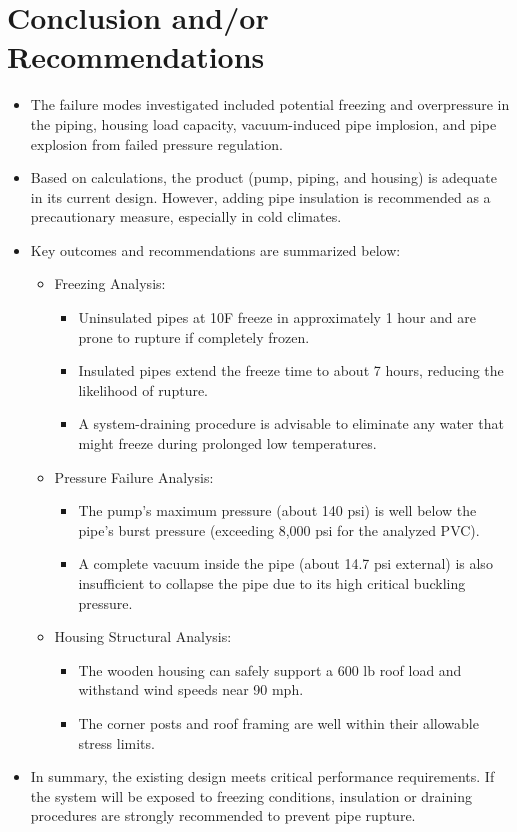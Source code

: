 \documentclass[12pt]{report}
\begin{document}
\newpage

\section{Conclusion and/or Recommendations}

\begin{itemize}
    \item The failure modes investigated included potential freezing and overpressure in the piping, housing load capacity, vacuum-induced pipe implosion, and pipe explosion from failed pressure regulation.
    \item Based on calculations, the product (pump, piping, and housing) is adequate in its current design. However, adding pipe insulation is recommended as a precautionary measure, especially in cold climates.
    \item Key outcomes and recommendations are summarized below:
    \begin{itemize}
        \item Freezing Analysis:
        \begin{itemize}
            \item Uninsulated pipes at 10\textdegree F freeze in approximately 1 hour and are prone to rupture if completely frozen.
            \item Insulated pipes extend the freeze time to about 7 hours, reducing the likelihood of rupture.
            \item A system-draining procedure is advisable to eliminate any water that might freeze during prolonged low temperatures.
        \end{itemize}
        \item Pressure Failure Analysis:
        \begin{itemize}
            \item The pump’s maximum pressure (about 140 psi) is well below the pipe’s burst pressure (exceeding 8,000 psi for the analyzed PVC).
            \item A complete vacuum inside the pipe (about 14.7 psi external) is also insufficient to collapse the pipe due to its high critical buckling pressure.
        \end{itemize}
        \item Housing Structural Analysis:
        \begin{itemize}
            \item The wooden housing can safely support a 600 lb roof load and withstand wind speeds near 90 mph.
            \item The corner posts and roof framing are well within their allowable stress limits.
        \end{itemize}
    \end{itemize}
    \item In summary, the existing design meets critical performance requirements. If the system will be exposed to freezing conditions, insulation or draining procedures are strongly recommended to prevent pipe rupture.
\end{itemize}
\end{document}

